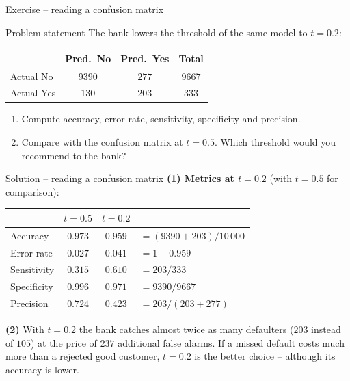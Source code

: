 \documentclass[aspectratio=169,11pt]{beamer}
\begin{document}
\begin{frame}{Exercise -- reading a confusion matrix}
  \begin{block}{Problem statement}
    The bank lowers the threshold of the same model to $t=0.2$:
    \begin{center}
      \renewcommand{\arraystretch}{1.2}
      \begin{tabular}{l|cc|c}
        \toprule
        & Pred.\ No & Pred.\ Yes & Total\\
        \midrule
        Actual No & $9390$ & $277$ & $9667$\\
        Actual Yes & $130$ & $203$ & $333$\\
        \bottomrule
      \end{tabular}
    \end{center}
    \begin{enumerate}
      \item Compute accuracy, error rate, sensitivity, specificity and
            precision.
      \item Compare with the confusion matrix at $t=0.5$. Which threshold would you
            recommend to the bank?
    \end{enumerate}
  \end{block}
\end{frame}

\begin{frame}{Solution -- reading a confusion matrix}
  \textbf{(1) Metrics at $t=0.2$} (with $t=0.5$ for comparison):
  \begin{center}
    \renewcommand{\arraystretch}{1.15}
    \begin{tabular}{lccl}
      \toprule
      & $t=0.5$ & $t=0.2$ & \\
      \midrule
      Accuracy & $0.973$ & $0.959$ & $=(9390+203)/10\,000$\\
      Error rate & $0.027$ & $0.041$ & $=1-0.959$\\
      Sensitivity & $0.315$ & $0.610$ & $=203/333$\\
      Specificity & $0.996$ & $0.971$ & $=9390/9667$\\
      Precision & $0.724$ & $0.423$ & $=203/(203+277)$\\
      \bottomrule
    \end{tabular}
  \end{center}
  \textbf{(2)} With $t=0.2$ the bank catches almost twice as many defaulters
  ($203$ instead of $105$) at the price of $237$ additional false alarms. If a
  missed default costs much more than a rejected good customer, $t=0.2$ is
  the better choice -- although its accuracy is lower.

  \medskip
\end{frame}
\end{document}
